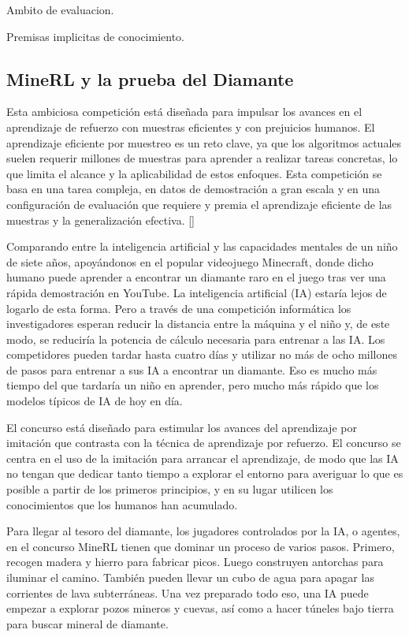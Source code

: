 Ambito de evaluacion.

Premisas implicitas de conocimiento.

\subsection{MineRL y la prueba del Diamante}

Esta ambiciosa competición está diseñada para impulsar los avances en el aprendizaje de refuerzo con muestras eficientes y con prejuicios humanos. El aprendizaje eficiente por muestreo es un reto clave, ya que los algoritmos actuales suelen requerir millones de muestras para aprender a realizar tareas concretas, lo que limita el alcance y la aplicabilidad de estos enfoques. Esta competición se basa en una tarea compleja, en datos de demostración a gran escala y en una configuración de evaluación que requiere y premia el aprendizaje eficiente de las muestras y la generalización efectiva. [\cite{hofmann2019minecraft}]

Comparando entre la inteligencia artificial y las capacidades mentales de un niño de siete años, apoyándonos en el popular videojuego Minecraft, donde dicho humano puede aprender a encontrar un diamante raro en el juego tras ver una rápida demostración en YouTube. La inteligencia artificial (IA) estaría lejos de logarlo de esta forma. Pero a través de una competición informática los investigadores esperan reducir la distancia entre la máquina y el niño y, de este modo, se reduciría la potencia de cálculo necesaria para entrenar a las IA.
Los competidores pueden tardar hasta cuatro días y utilizar no más de ocho millones de pasos para entrenar a sus IA a encontrar un diamante. Eso es mucho más tiempo del que tardaría un niño en aprender, pero mucho más rápido que los modelos típicos de IA de hoy en día.

El concurso está diseñado para estimular los avances del aprendizaje por imitación que contrasta con la técnica de aprendizaje por refuerzo. El concurso se centra en el uso de la imitación para arrancar el aprendizaje, de modo que las IA no tengan que dedicar tanto tiempo a explorar el entorno para averiguar lo que es posible a partir de los primeros principios, y en su lugar utilicen los conocimientos que los humanos han acumulado. 

Para llegar al tesoro del diamante, los jugadores controlados por la IA, o agentes, en el concurso MineRL tienen que dominar un proceso de varios pasos. Primero, recogen madera y hierro para fabricar picos. Luego construyen antorchas para iluminar el camino. También pueden llevar un cubo de agua para apagar las corrientes de lava subterráneas. Una vez preparado todo eso, una IA puede empezar a explorar pozos mineros y cuevas, así como a hacer túneles bajo tierra para buscar mineral de diamante.

